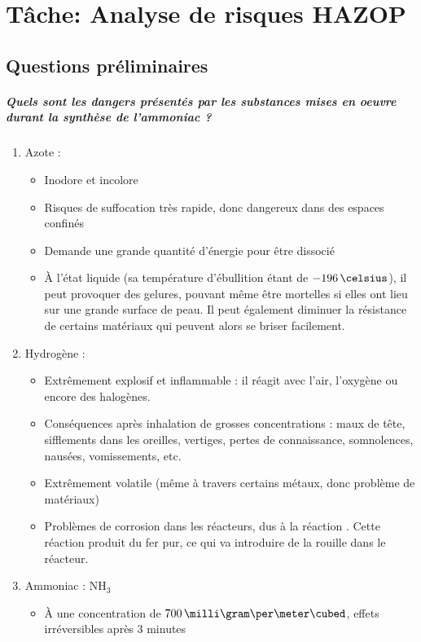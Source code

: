 \chapter{Tâche: Analyse de risques HAZOP}

\section{Questions préliminaires}
\paragraph{Quels sont les dangers présentés par les substances mises en oeuvre durant la synthèse de l'ammoniac ?}
\begin{enumerate}
\item Azote : 
\begin{itemize}
\item Inodore et incolore
\item Risques de suffocation très rapide, donc dangereux dans des espaces confinés
\item Demande une grande quantité d’énergie pour être dissocié
\item À l'état liquide (sa température d'ébullition étant de $-196\,\celsius$), il peut provoquer des gelures, pouvant même être mortelles si elles ont lieu sur une grande surface de peau. Il peut également diminuer la résistance de certains matériaux qui peuvent alors se briser facilement.
\end{itemize}
\item Hydrogène : 
\begin{itemize}
\item Extrêmement explosif et inflammable : il réagit avec l'air, l'oxygène ou encore des halogènes.
\item Conséquences après inhalation de grosses concentrations : maux de tête, sifflements dans les oreilles, vertiges, pertes de connaissance, somnolences,  nausées, vomissements, etc.
\item Extrêmement volatile (même à travers certains métaux, donc problème de matériaux)
\item Problèmes de corrosion dans les réacteurs, dus à la réaction
.
Cette réaction produit du fer pur, ce qui va introduire de la rouille dans le réacteur.
\end{itemize}
\item Ammoniac : NH$_3$
\begin{itemize}
\item À une concentration de $700\,\milli\gram\per\meter\cubed$, effets irréversibles après 3 minutes

\end{itemize}
\end{enumerate}
